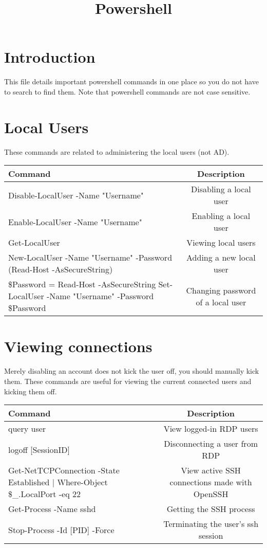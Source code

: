 \documentclass{article}
\title{Powershell}
\begin{document}
\maketitle

\graphicspath{ {./Images/} }
\tableofcontents

\section{Introduction}
This file details important powershell commands in one place so you do not have to search to find them.
Note that powershell commands are not case sensitive.

\section{Local Users}
These commands are related to administering the local users (not AD).

\begin{table}[h]
\centering
\begin{tabular}{| m{20em} |c|} %
\hline
Command & Description \\
\hline
Disable-LocalUser -Name "Username" & Disabling a local user \\
\hline
Enable-LocalUser -Name "Username" & Enabling a local user \\
\hline
Get-LocalUser & Viewing local users \\
\hline
New-LocalUser -Name "Username" 
-Password (Read-Host -AsSecureString) & Adding a new local user \\
\hline
\$Password = Read-Host -AsSecureString
Set-LocalUser -Name "Username" -Password \$Password & Changing password of a local user \\
\hline
\end{tabular}
\end{table}

\section{Viewing connections}
Merely disabling an account does not kick the user off, you should manually kick them.
These commands are useful for viewing the current connected users and kicking them off.
\begin{table}[H]
\centering
\begin{tabular}{| m{20em} |c|} %
\hline
Command & Description \\
\hline
query user & View logged-in RDP users \\
\hline
logoff [SessionID] & Disconnecting a user from RDP \\
\hline
Get-NetTCPConnection -State Established | 
Where-Object { \$\_.LocalPort -eq 22 } & View active SSH connections made with OpenSSH \\
\hline
Get-Process -Name sshd & Getting the SSH process \\
\hline
Stop-Process -Id [PID] -Force & Terminating the user's ssh session \\
\hline
\end{tabular}
\end{table}
\end{document}
